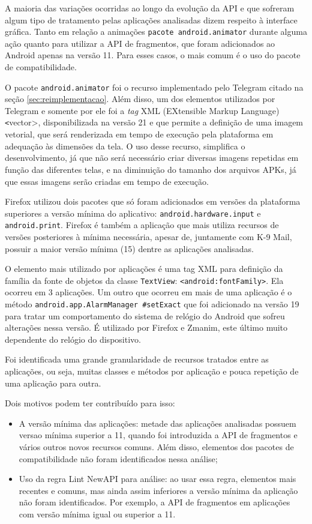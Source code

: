 A maioria das variações ocorridas ao longo da evolução da API e que sofreram algum
tipo de tratamento pelas aplicações analisadas dizem respeito à interface gráfica.
Tanto em relação a animações \texttt{pacote android.animator} durante alguma ação
quanto para utilizar a API de fragmentos, que foram adicionados ao Android apenas
na versão 11. Para esses casos, o mais comum é o uso do pacote de compatibilidade.

O pacote \texttt{android.animator} foi o recurso implementado pelo Telegram citado
na seção \ref{sec:reimplementacao}. Além disso, um dos elementos utilizados por
Telegram e somente por ele foi a \textit{tag} XML (EXtensible Markup Language) \texttt<vector>,
disponibilizada
na versão 21 e que permite a definição de uma imagem vetorial, que será renderizada
em tempo de execução pela plataforma em adequação às dimensões da tela. O uso desse
recurso, simplifica o desenvolvimento, já que não será necessário criar diversas
imagens repetidas em função das diferentes telas, e na diminuição do tamanho dos
arquivos APKs, já que essas imagens serão criadas em tempo de execução.

Firefox utilizou dois pacotes que só foram adicionados em versões da plataforma
superiores a versão mínima do aplicativo: \texttt{android.hardware.input} e
\texttt{android.print}. Firefox é também a aplicação que mais utiliza recursos
de versões posteriores à mínima necessária, apesar de, juntamente com K-9 Mail,
possuir a maior versão mínima (15) dentre as aplicações analisadas.

O elemento mais utilizado por aplicações é uma tag XML para definição da família
da fonte de objetos da classe \texttt{TextView}: \texttt{<android:fontFamily>}.
Ela ocorreu em 3 aplicações. Um outro que ocorreu em mais de uma aplicação é o
método \texttt{android.app.AlarmManager \#setExact} que foi adicionado na versão
19 para tratar um comportamento do sistema de relógio do Android que sofreu
alterações nessa versão. É utilizado por Firefox e Zmanim, este último muito
dependente do relógio do dispositivo.

Foi identificada uma grande granularidade de recursos tratados entre as aplicações,
ou seja, muitas classes e métodos por aplicação e pouca repetição de uma aplicação
para outra.
 
Dois motivos podem ter contribuído para isso:
\begin{itemize}
    \item A versão mínima das aplicações: metade das aplicações analisadas possuem
        versao mínima superior a 11, quando foi introduzida a API de fragmentos e
        vários outros novos recursos comuns. Além disso, elementos dos pacotes
        de compatibilidade não foram identificados nessa análise;
   \item Uso da regra Lint NewAPI para análise: ao usar essa regra, elementos
        mais recentes e comuns, mas ainda assim inferiores a versão mínima da
        aplicação não foram identificados. Por exemplo, a API de fragmentos em
        aplicações com versão mínima igual ou superior a 11.
\end{itemize}



